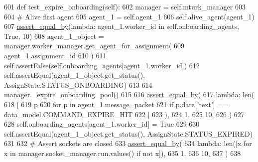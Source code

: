 \begin{DoxyCode}
601     \textcolor{keyword}{def }test\_expire\_onboarding(self):
602         manager = self.mturk\_manager
603 
604         \textcolor{comment}{# Alive first agent}
605         agent\_1 = self.agent\_1
606         self.alive\_agent(agent\_1)
607         \hyperlink{namespaceparlai_1_1mturk_1_1core_1_1test_1_1test__full__system_a0b463246d35658a2e422010f13dcf819}{assert\_equal\_by}(\textcolor{keyword}{lambda}: agent\_1.worker\_id \textcolor{keywordflow}{in} self.onboarding\_agents, \textcolor{keyword}{True}, 10)
608         agent\_1\_object = manager.worker\_manager.get\_agent\_for\_assignment(
609             agent\_1.assignment\_id
610         )
611         self.assertFalse(self.onboarding\_agents[agent\_1.worker\_id])
612         self.assertEqual(agent\_1\_object.get\_status(), AssignState.STATUS\_ONBOARDING)
613 
614         manager.\_expire\_onboarding\_pool()
615 
616         \hyperlink{namespaceparlai_1_1mturk_1_1core_1_1test_1_1test__full__system_a0b463246d35658a2e422010f13dcf819}{assert\_equal\_by}(
617             \textcolor{keyword}{lambda}: len(
618                 [
619                     p
620                     \textcolor{keywordflow}{for} p \textcolor{keywordflow}{in} agent\_1.message\_packet
621                     \textcolor{keywordflow}{if} p.data[\textcolor{stringliteral}{'text'}] == data\_model.COMMAND\_EXPIRE\_HIT
622                 ]
623             ),
624             1,
625             10,
626         )
627 
628         self.onboarding\_agents[agent\_1.worker\_id] = \textcolor{keyword}{True}
629 
630         self.assertEqual(agent\_1\_object.get\_status(), AssignState.STATUS\_EXPIRED)
631 
632         \textcolor{comment}{# Assert sockets are closed}
633         \hyperlink{namespaceparlai_1_1mturk_1_1core_1_1test_1_1test__full__system_a0b463246d35658a2e422010f13dcf819}{assert\_equal\_by}(
634             \textcolor{keyword}{lambda}: len([x \textcolor{keywordflow}{for} x \textcolor{keywordflow}{in} manager.socket\_manager.run.values() \textcolor{keywordflow}{if} \textcolor{keywordflow}{not} x]),
635             1,
636             10,
637         )
638 
\end{DoxyCode}
\mbox{\label{classparlai_1_1mturk_1_1core_1_1test_1_1test__full__system_1_1TestMTurkManagerWorkflows_a65ea28ad81308473c22580178fa57a90}} 
